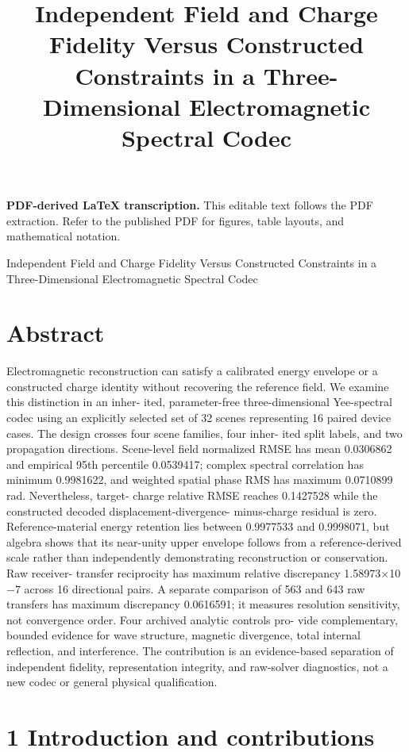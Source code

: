\documentclass[11pt]{article}
\title{Independent Field and Charge Fidelity Versus Constructed Constraints in a Three-Dimensional Electromagnetic Spectral Codec}
\author{}
\date{}
\begin{document}
\maketitle
\noindent\textbf{PDF-derived LaTeX transcription.} This editable text follows the PDF extraction. Refer to the published PDF for figures, table layouts, and mathematical notation.


Independent Field and Charge Fidelity Versus Constructed
Constraints in a Three-Dimensional Electromagnetic Spectral
Codec

\section*{Abstract}

Electromagnetic reconstruction can satisfy a calibrated energy envelope or a constructed
charge identity without recovering the reference field. We examine this distinction in an inher-
ited, parameter-free three-dimensional Yee-spectral codec using an explicitly selected set of 32
scenes representing 16 paired device cases. The design crosses four scene families, four inher-
ited split labels, and two propagation directions. Scene-level field normalized RMSE has mean
0.0306862 and empirical 95th percentile 0.0539417; complex spectral correlation has minimum
0.9981622, and weighted spatial phase RMS has maximum 0.0710899 rad. Nevertheless, target-
charge relative RMSE reaches 0.1427528 while the constructed decoded displacement-divergence-
minus-charge residual is zero. Reference-material energy retention lies between 0.9977533 and
0.9998071, but algebra shows that its near-unity upper envelope follows from a reference-derived
scale rather than independently demonstrating reconstruction or conservation. Raw receiver-
transfer reciprocity has maximum relative discrepancy 1.58973\ensuremath{\times}10\ensuremath{-}7 across 16 directional pairs.
A separate comparison of 563 and 643 raw transfers has maximum discrepancy 0.0616591; it
measures resolution sensitivity, not convergence order. Four archived analytic controls pro-
vide complementary, bounded evidence for wave structure, magnetic divergence, total internal
reflection, and interference. The contribution is an evidence-based separation of independent
fidelity, representation integrity, and raw-solver diagnostics, not a new codec or general physical
qualification.

\section*{1 Introduction and contributions}
\end{document}
